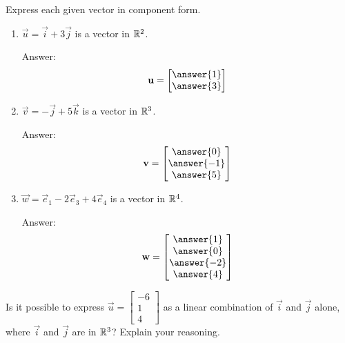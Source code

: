 \documentclass{ximera}
\begin{document}
\begin{problem}
Express each given vector in component form.
  \begin{enumerate}
  \item 
  $\vec{u}=\vec{i}+3\vec{j}$ is a vector in $\mathbb{R}^2$.
  
  Answer:
  $$\vec{u}=\begin{bmatrix}\answer{1}\\\answer{3}\end{bmatrix}$$
  \item
  $\vec{v}=-\vec{j}+5\vec{k}$ is a vector in $\mathbb{R}^3$.
  
  Answer:
  $$\vec{v}=\begin{bmatrix}\answer{0}\\\answer{-1}\\\answer{5}\end{bmatrix}$$
  \item
  $\vec{w}=\vec{e}_1-2\vec{e}_3+4\vec{e}_4$ is a vector in $\mathbb{R}^4$.
  
  Answer:
  $$\vec{w}=\begin{bmatrix}\answer{1}\\\answer{0}\\\answer{-2}\\\answer{4}\end{bmatrix}$$
  \end{enumerate}
  \end{problem}
  
  \begin{problem}
  Is it possible to express $\vec{u}=\begin{bmatrix}
-6\\
1\\
4
\end{bmatrix}$ as a linear combination of $\vec{i}$ and $\vec{j}$ alone, where $\vec{i}$ and $\vec{j}$ are in $\mathbb{R}^3$?  Explain your reasoning.
\end{problem}
\end{document}
